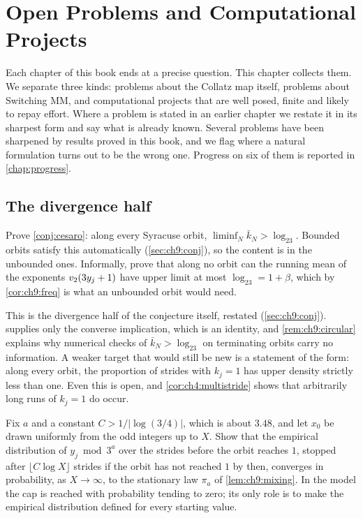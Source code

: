 \chapter{Open Problems and Computational Projects}\label{chap:open}

Each chapter of this book ends at a precise question. This chapter collects
them. We separate three kinds: problems about the Collatz map itself, problems
about Switching MM, and computational projects that are well posed, finite and
likely to repay effort. Where a problem is stated in an earlier chapter we
restate it in its sharpest form and say what is already known. Several problems
have been sharpened by results proved in this book, and we flag where a
natural formulation turns out to be the wrong one. Progress on six of them is reported in \cref{chap:progress}.

\section{The divergence half}\label{sec:ch11:divergence}

\begin{problem*}\label{prob:ch11:o1}
Prove \cref{conj:cesaro}: along every Syracuse orbit, $\liminf_N\bar k_N>\log_23$. Bounded orbits satisfy this automatically (\cref{sec:ch9:conj}), so the content is in the unbounded ones. Informally, prove that along no orbit can the running mean of the exponents $v_2(3y_j+1)$ have upper limit at most $\log_23=1+\beta$, which by \cref{cor:ch9:freq} is what an unbounded orbit would need.
\end{problem*}

This is the divergence half of the conjecture itself, restated
(\cref{sec:ch9:conj}).  supplies only the converse implication, which is an
identity, and \cref{rem:ch9:circular} explains why numerical checks of
$\bar k_N>\log_23$ on terminating orbits carry no information. A weaker target
that would still be new is a statement of the form: along every orbit, the
proportion of strides with $k_j=1$ has upper density strictly less than one.
Even this is open, and \cref{cor:ch4:multistride} shows that arbitrarily long
runs of $k_j=1$ do occur.

\begin{problem*}\label{prob:ch11:o2}
Fix $a$ and a constant $C>1/|\log(3/4)|$, which is about $3.48$, and let $x_0$ be drawn uniformly from the odd integers up to $X$.
Show that the empirical distribution of $y_j\bmod3^a$ over the strides before the orbit reaches $1$, stopped after $\lfloor C\log X\rfloor$ strides if the orbit has not reached $1$ by then, converges in probability, as $X\to\infty$, to the stationary law $\pi_a$ of \cref{lem:ch9:mixing}.
In the model the cap is reached with probability tending to zero; its only role is to make the empirical distribution defined for every starting value.
\end{problem*}

